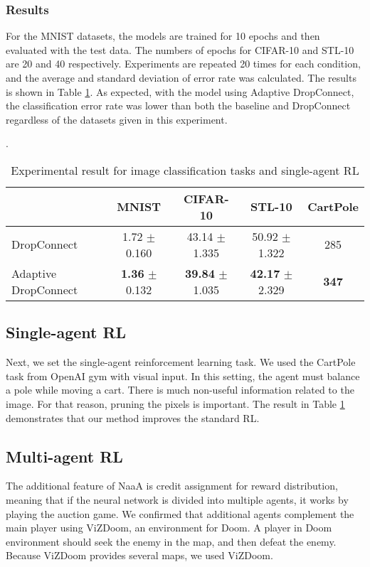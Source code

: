 \subsubsection{Results}
For the MNIST datasets, the models are trained for 10 epochs and then evaluated with the test data. The numbers of epochs for CIFAR-10 and STL-10 are 20 and 40 respectively. Experiments are repeated 20 times for each condition, and the average and standard deviation of  error rate was calculated. The results is shown in Table \ref{tbl:cls}. As expected, with the model using Adaptive DropConnect, the classification error rate was lower than both the baseline and DropConnect regardless of the datasets given in this experiment.


\begin{table}[h]
	\caption{ Experimental result for image classification tasks and single-agent RL }\label{tbl:cls}. 
\centering
\begin{tabular}{l|ccc|c}
\hline
		& MNIST & CIFAR-10 & STL-10 & CartPole \\
\hline
		DropConnect \citep{wan2013regularization}	&	1.72 $\pm$ 0.160	&	43.14 $\pm$ 1.335	&	50.92 $\pm$ 1.322 & 285 \\
		Adaptive DropConnect	&	\textbf{1.36} $\pm$ 0.132	&	\textbf{39.84} $\pm$ 1.035	&	\textbf{42.17} $\pm$ 2.329 & \textbf{347} \\
\hline
\end{tabular}
\end{table}

\subsection{Single-agent RL}
Next, we set the single-agent reinforcement learning task.
We used the CartPole task from OpenAI gym with visual input.
In this setting, the agent must balance a pole while moving a cart.
There is much non-useful information related to the image. For that reason, pruning the pixels is important.
The result in Table \ref{tbl:cls} demonstrates that our method improves the standard RL.

\subsection{Multi-agent RL}
The additional feature of NaaA is credit assignment for reward distribution, 
meaning that if the neural network is divided into multiple agents, it works by playing the auction game.
We confirmed that additional agents complement the main player using ViZDoom, an environment for Doom.
A player in Doom environment should seek the enemy in the map, and then defeat the enemy.
Because ViZDoom provides several maps, we used ViZDoom.

